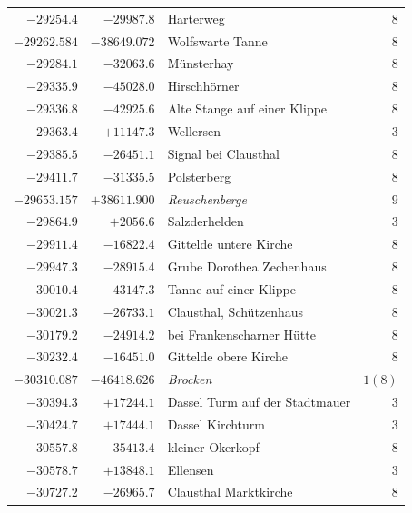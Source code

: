 \begin{center}
\begin{tabular}{r|r|p{170pt}|r}
\(-29254.4\)&\(-29987.8\)&Harterweg&\(8\)\\
\(-29262.584\)&\(-38649.072\)&Wolfswarte Tanne&\(8\)\\
\(-29284.1\)&\(-32063.6\)&Münsterhay&\(8\)\\
\(-29335.9\)&\(-45028.0\)&Hirschhörner&\(8\)\\
\(-29336.8\)&\(-42925.6\)&Alte Stange auf einer Klippe&\(8\)\\
\(-29363.4\)&\(+11147.3\)&Wellersen&\(3\)\\
\(-29385.5\)&\(-26451.1\)&Signal bei Clausthal&\(8\)\\
\(-29411.7\)&\(-31335.5\)&Polsterberg&\(8\)\\
\(-29653.157\)&\(+38611.900\)&\textit{Reuschenberge}&\(9\)\\
\(-29864.9\)&\(+2056.6\)&Salzderhelden&\(3\)\\
\(-29911.4\)&\(-16822.4\)&Gittelde untere Kirche&\(8\)\\
\(-29947.3\)&\(-28915.4\)&Grube Dorothea Zechenhaus&\(8\)\\
\(-30010.4\)&\(-43147.3\)&Tanne auf einer Klippe&\(8\)\\
\(-30021.3\)&\(-26733.1\)&Clausthal, Schützenhaus&\(8\)\\
\(-30179.2\)&\(-24914.2\)&bei Frankenscharner Hütte&\(8\)\\
\(-30232.4\)&\(-16451.0\)&Gittelde obere Kirche&\(8\)\\
\(-30310.087\)&\(-46418.626\)&\textit{Brocken}&\(1 (8)\)\\
\(-30394.3\)&\(+17244.1\)&Dassel Turm auf der Stadtmauer&\(3\)\\
\(-30424.7\)&\(+17444.1\)&Dassel Kirchturm&\(3\)\\
\(-30557.8\)&\(-35413.4\)&kleiner Okerkopf&\(8\)\\
\(-30578.7\)&\(+13848.1\)&Ellensen&\(3\)\\
\(-30727.2\)&\(-26965.7\)&Clausthal Marktkirche&\(8\)\\
\hline\end{tabular}\endgroup\end{center}
\clearpage
